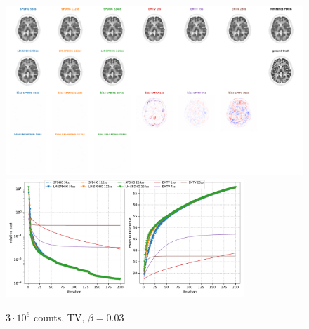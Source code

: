 \begin{figure}
  \centering
    \includegraphics[width=1.0\textwidth]{./figs/brain2d_counts_3.0E+06_seed_1_beta_3.0E-02_prior_TV_niter_ref_20000_fwhm_4.5_4.5_niter_200.png}
    \includegraphics[width=0.8\textwidth]{./figs/brain2d_counts_3.0E+06_seed_1_beta_3.0E-02_prior_TV_niter_ref_20000_fwhm_4.5_4.5_niter_200_metrics.pdf}
  \caption{$3\cdot10^6$ counts, TV, $\beta = 0.03$}
  \label{fig:metrics}
\end{figure}

